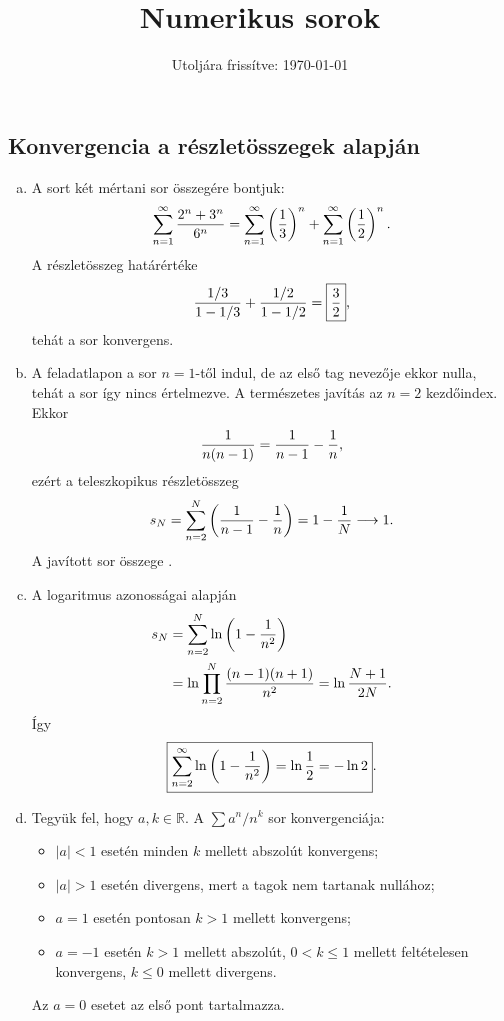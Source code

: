 \documentclass{szb-solution}
\title{Numerikus sorok}
\date{Utoljára frissítve: \today}
\begin{document}
\maketitle

\subsection{Konvergencia a részletösszegek alapján}

\begin{enumerate}[a)]
  \item A sort két mértani sor összegére bontjuk:
        $$
          \sum_{n=1}^{\infty}\frac{2^n+3^n}{6^n}
          =\sum_{n=1}^{\infty}\left(\frac13\right)^n
           +\sum_{n=1}^{\infty}\left(\frac12\right)^n
          \text.
        $$
        A részletösszeg határértéke
        $$
          \frac{1/3}{1-1/3}+\frac{1/2}{1-1/2}
          =\boxed{\frac32}
          \text,
        $$
        tehát a sor konvergens.

  \item A feladatlapon a sor $n=1$-től indul, de az első tag nevezője ekkor
        nulla, tehát a sor így nincs értelmezve. A természetes javítás az
        $n=2$ kezdőindex. Ekkor
        $$
          \frac1{n(n-1)}=\frac1{n-1}-\frac1n
          \text,
        $$
        ezért a teleszkopikus részletösszeg
        $$
          s_N=\sum_{n=2}^{N}\left(\frac1{n-1}-\frac1n\right)
             =1-\frac1N\longrightarrow1
          \text.
        $$
        A javított sor összege .

  \item A logaritmus azonosságai alapján
        \begin{align*}
          s_N
          &=\sum_{n=2}^{N}\ln\left(1-\frac1{n^2}\right)\\
          &=\ln\prod_{n=2}^{N}\frac{(n-1)(n+1)}{n^2}
            =\ln\frac{N+1}{2N}
          \text.
        \end{align*}
        Így
        $$
          \boxed{\sum_{n=2}^{\infty}\ln\left(1-\frac1{n^2}\right)
          =\ln\frac12=-\ln2}
          \text.
        $$

  \item Tegyük fel, hogy $a,k\in\mathbb R$. A
        $\sum a^n/n^k$ sor konvergenciája:
        \begin{itemize}
          \item $|a|<1$ esetén minden $k$ mellett abszolút konvergens;
          \item $|a|>1$ esetén divergens, mert a tagok nem tartanak nullához;
          \item $a=1$ esetén pontosan $k>1$ mellett konvergens;
          \item $a=-1$ esetén $k>1$ mellett abszolút, $0<k\leq1$ mellett
                feltételesen konvergens, $k\leq0$ mellett divergens.
        \end{itemize}
        Az $a=0$ esetet az első pont tartalmazza.
\end{enumerate}
\end{document}
